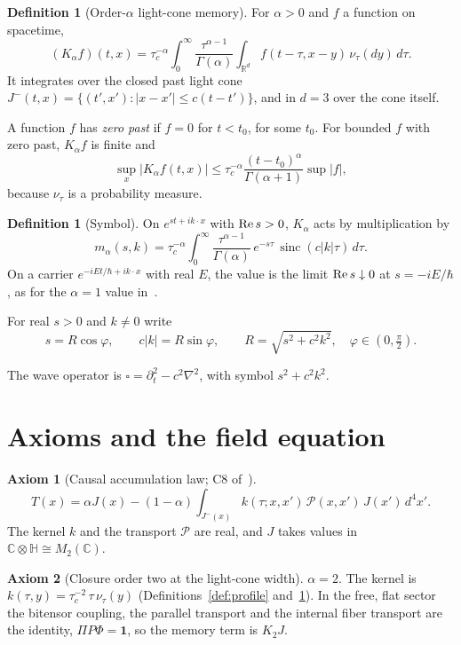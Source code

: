 \documentclass[11pt]{amsart}
\theoremstyle{definition}
\newtheorem{definition}[theorem]{Definition}
\newtheorem{axiom}{Axiom}
\theoremstyle{remark}
\newcommand{\one}{\mathbf 1}
\newcommand{\sinc}{\operatorname{sinc}}
\begin{document}
\begin{definition}[Order-$\alpha$ light-cone memory]\label{def:memory}
For $\alpha>0$ and $f$ a function on spacetime,
\[
(K_\alpha f)(t,x)=\tau_c^{-\alpha}\int_0^\infty\frac{\tau^{\alpha-1}}{\Gamma(\alpha)}\int_{\mathbb R^d}f(t-\tau,x-y)\,\nu_\tau(dy)\,d\tau .
\]
It integrates over the closed past light cone $J^-(t,x)=\{(t',x'):\lvert x-x'\rvert\le c(t-t')\}$, and in $d=3$ over the cone itself.

A function $f$ has \emph{zero past} if $f=0$ for $t<t_0$, for some $t_0$. For bounded $f$ with zero past, $K_\alpha f$ is finite and
\[
\sup_x\lvert K_\alpha f(t,x)\rvert\le\tau_c^{-\alpha}\frac{(t-t_0)^\alpha}{\Gamma(\alpha+1)}\sup\lvert f\rvert,
\]
because $\nu_\tau$ is a probability measure.
\end{definition}

\begin{definition}[Symbol]\label{def:symbol}
On $e^{st+ik\cdot x}$ with ${\rm Re}\,s>0$, $K_\alpha$ acts by multiplication by
\[
m_\alpha(s,k)=\tau_c^{-\alpha}\int_0^\infty\frac{\tau^{\alpha-1}}{\Gamma(\alpha)}\,e^{-s\tau}\,\sinc(c\lvert k\rvert\tau)\,d\tau .
\]
On a carrier $e^{-iEt/\hbar+ik\cdot x}$ with real $E$, the value is the limit ${\rm Re}\,s\downarrow0$ at $s=-iE/\hbar$, as for the $\alpha=1$ value in~\cite[Def.~2.1]{Edge}.

For real $s>0$ and $k\ne0$ write
\[
s=R\cos\varphi,\qquad c\lvert k\rvert=R\sin\varphi,\qquad R=\sqrt{s^2+c^2k^2},\quad\varphi\in(0,\tfrac\pi2).
\]
\end{definition}

The wave operator is $\square=\partial_t^2-c^2\nabla^2$, with symbol $s^2+c^2k^2$.

\section{Axioms and the field equation}

\begin{axiom}[Causal accumulation law; C8 of~\cite{CAL}]\label{ax:CAL}
\[
T(x)=\alpha J(x)-(1-\alpha)\int_{J^-(x)}k(\tau;x,x')\,\mathcal P(x,x')\,J(x')\,d^4x'.
\]
The kernel $k$ and the transport $\mathcal P$ are real, and $J$ takes values in $\mathbb C\otimes\mathbb H\cong M_2(\mathbb C)$.
\end{axiom}

\begin{axiom}[Closure order two at the light-cone width]\label{ax:order2}
$\alpha=2$. The kernel is $k(\tau,y)=\tau_c^{-2}\,\tau\,\nu_\tau(y)$ (Definitions~\ref{def:profile} and~\ref{def:memory}). In the free, flat sector the bitensor coupling, the parallel transport and the internal fiber transport are the identity, $\Pi P\Phi=\one$, so the memory term is $K_2J$.
\end{axiom}
\end{document}
